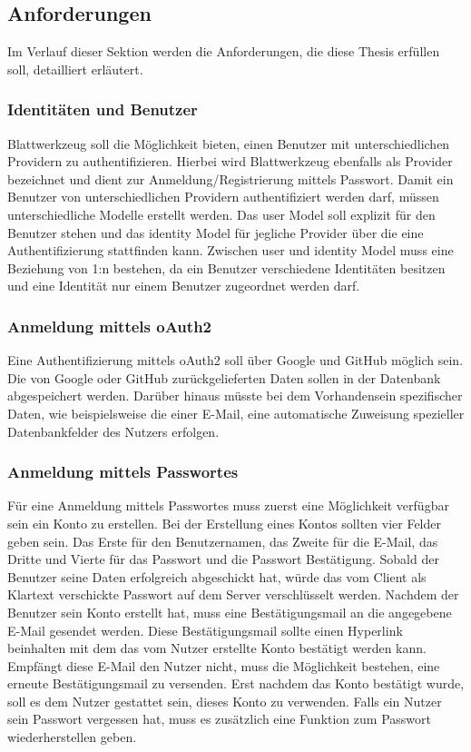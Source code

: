 \subsection{Anforderungen}
\label{sec: requirement}
Im Verlauf dieser Sektion werden die Anforderungen, die diese Thesis erfüllen soll, detailliert erläutert.

\subsubsection{Identitäten und Benutzer}
\label{sec:identities_users}
Blattwerkzeug soll die Möglichkeit bieten, einen Benutzer mit unterschiedlichen Providern zu authentifizieren. Hierbei wird Blattwerkzeug ebenfalls als Provider bezeichnet und dient zur Anmeldung/Registrierung mittels Passwort. Damit ein Benutzer von unterschiedlichen Providern authentifiziert werden darf, müssen unterschiedliche Modelle erstellt werden. Das user Model soll explizit für den Benutzer stehen und das identity Model für jegliche Provider über die eine Authentifizierung stattfinden kann. Zwischen user und identity Model muss eine Beziehung von 1:n bestehen, da ein Benutzer verschiedene Identitäten besitzen und eine Identität nur einem Benutzer zugeordnet werden darf.

\subsubsection{Anmeldung mittels \gls{oAuth2}}
Eine Authentifizierung mittels oAuth2 soll über Google und GitHub möglich sein. Die von Google oder GitHub zurückgelieferten Daten sollen in der Datenbank abgespeichert werden. Darüber hinaus müsste bei dem Vorhandensein spezifischer Daten, wie beispielsweise die einer E-Mail, eine automatische Zuweisung spezieller Datenbankfelder des Nutzers erfolgen.

\subsubsection{Anmeldung mittels Passwortes}
Für eine Anmeldung mittels Passwortes muss zuerst eine Möglichkeit verfügbar sein ein Konto zu erstellen. Bei der Erstellung eines Kontos sollten vier Felder geben sein. Das Erste für den Benutzernamen, das Zweite für die E-Mail, das Dritte und Vierte für das Passwort und die Passwort Bestätigung. Sobald der Benutzer seine Daten erfolgreich abgeschickt hat, würde das vom Client als Klartext verschickte Passwort auf dem Server verschlüsselt werden. Nachdem der Benutzer sein Konto erstellt hat, muss eine Bestätigungsmail an die angegebene E-Mail gesendet werden. Diese Bestätigungsmail sollte einen Hyperlink beinhalten mit dem das vom Nutzer erstellte Konto bestätigt werden kann. Empfängt diese E-Mail den Nutzer nicht, muss die Möglichkeit bestehen, eine erneute Bestätigungsmail zu versenden. Erst nachdem das Konto bestätigt wurde, soll es dem Nutzer gestattet sein, dieses Konto zu verwenden. Falls ein Nutzer sein Passwort vergessen hat, muss es zusätzlich eine Funktion zum Passwort wiederherstellen geben.

